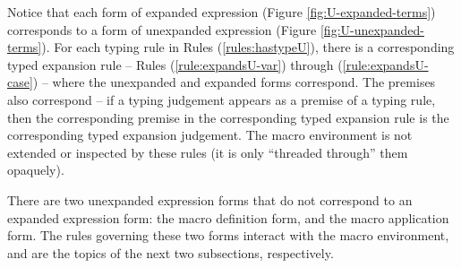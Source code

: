 Notice that each form of expanded expression (Figure \ref{fig:U-expanded-terms}) corresponds to a form of unexpanded expression (Figure \ref{fig:U-unexpanded-terms}). For each typing rule in Rules (\ref{rules:hastypeU}), there is a corresponding typed expansion rule -- Rules (\ref{rule:expandsU-var}) through (\ref{rule:expandsU-case}) -- where the unexpanded and expanded forms correspond. The premises also correspond -- if a typing judgement appears as a premise of a typing rule, then the corresponding premise in the corresponding typed expansion rule is the corresponding typed expansion judgement. The macro environment is not extended or inspected by these rules (it is only ``threaded through'' them opaquely).

There are two unexpanded expression forms that do not correspond to an expanded expression form: the macro definition form, and the macro application form. The rules governing these two forms interact with the macro environment, and are the topics of the next two subsections, respectively.

